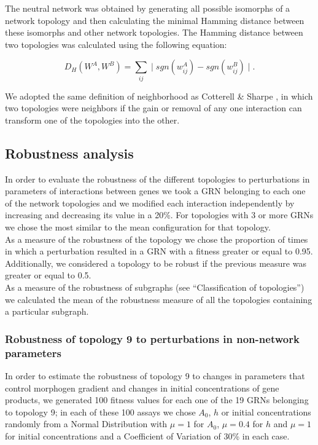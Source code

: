 \documentclass[10pt,letterpaper]{article}
\begin{document}
The neutral network was obtained by generating all possible isomorphs of a 
network topology and then calculating the minimal Hamming distance between these
isomorphs and other network topologies. The Hamming distance between two 
topologies was calculated using the following equation:

\begin{equation}
 D_H(W^A, W^B) = \sum_{ij} \mid sgn(w_{ij}^A) - sgn(w^B_{ij}) \mid .
\end{equation}

We adopted the same definition of neighborhood as Cotterell \& Sharpe 
\cite{Cotterell2010}, in which two topologies were neighbors if the gain or 
removal of any one interaction can transform one of the topologies into the 
other.

\subsection*{Robustness analysis}

In order to evaluate the robustness of the different topologies to perturbations
in parameters of interactions between genes we took a GRN belonging to each one 
of the network topologies and we modified each interaction independently by 
increasing and decreasing its value in a 20\%. For topologies with 3 or more 
GRNs we chose the most similar to the mean configuration for that topology.\\

As a measure of the robustness of the topology we chose the proportion of times 
in which a perturbation resulted in a GRN with a fitness greater or equal to 
0.95. Additionally, we considered a topology to be robust if the previous 
measure was greater or equal to 0.5.\\

As a measure of the robustness of subgraphs (see “Classification of topologies”)
we calculated the mean of the robustness measure of all the topologies 
containing a particular subgraph.\\

\subsubsection*{Robustness of topology 9 to perturbations in non-network parameters}

In order to estimate the robustness of topology 9 to changes in parameters that 
control morphogen gradient and changes in initial concentrations of gene 
products, we generated 100 fitness values for each one of the 19 GRNs 
belonging to topology 9; in each of these 100 assays we chose $A_0$, $h$ or 
initial concentrations randomly from a Normal Distribution with $\mu = 1$ for 
$A_0$, $\mu = 0.4$ for $h$ and $\mu = 1$ for initial concentrations and a 
Coefficient of Variation of 30\% in each case.
\end{document}
